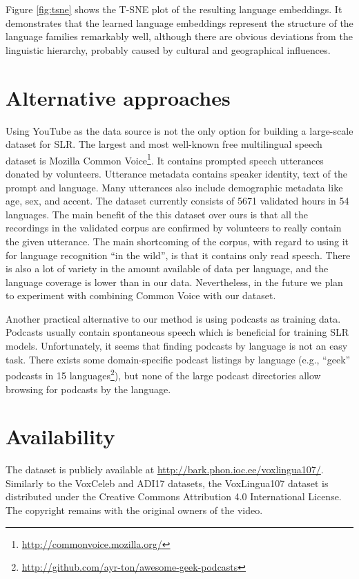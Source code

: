 \documentclass{article}
\begin{document}
Figure \ref{fig:tsne} shows the T-SNE plot of the resulting language embeddings.
It demonstrates that the learned language embeddings represent the structure of the language families remarkably well, although there are obvious deviations from the linguistic hierarchy, probably caused by cultural and geographical influences.

\section{Alternative approaches}



Using YouTube as the data source is not the only option for building a large-scale dataset for SLR.
The largest and most well-known free multilingual speech dataset is Mozilla Common Voice\footnote{\url{http://commonvoice.mozilla.org/}}. It contains prompted speech utterances donated by volunteers. Utterance metadata contains speaker identity, text of the prompt and language. Many utterances also include demographic metadata like age, sex, and accent. The dataset currently consists of 5671 validated hours in 54 languages. The main benefit of the this dataset over ours is that all the recordings in the validated corpus are confirmed by volunteers to really contain the given utterance. The main shortcoming of the corpus, with regard to using it for language recognition ``in the wild'', is that it contains only read speech. There is also a lot of variety in the amount available of data per language, and the language coverage is lower than in our data. Nevertheless, in the future we plan to experiment with combining Common Voice with our dataset.

Another practical alternative to our method is using podcasts as training data. 
Podcasts usually contain spontaneous speech which is beneficial for training SLR models.
Unfortunately, it seems that finding podcasts by language is not an easy task. There exists some domain-specific podcast listings by language (e.g., ``geek'' podcasts in 15 languages\footnote{\url{http://github.com/ayr-ton/awesome-geek-podcasts}}), but none of the large podcast directories allow browsing for podcasts by the language.

\section{Availability}

The dataset is publicly available at \url{http://bark.phon.ioc.ee/voxlingua107/}. Similarly to the VoxCeleb and ADI17 datasets, the VoxLingua107 dataset is distributed under the Creative Commons Attribution 4.0 International License. The copyright remains with the original owners of the video. 
\end{document}
